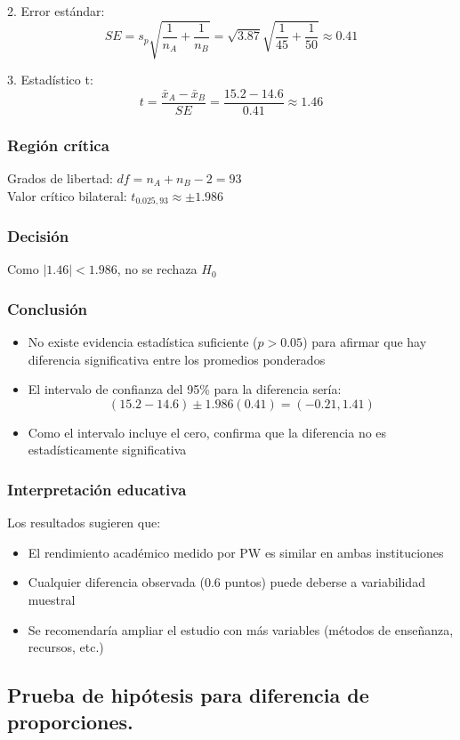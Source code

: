 2. Error estándar:
\[
SE = s_p\sqrt{\frac{1}{n_A} + \frac{1}{n_B}} = \sqrt{3.87}\sqrt{\frac{1}{45} + \frac{1}{50}} \approx 0.41
\]

3. Estadístico t:
\[
t = \frac{\bar{x}_A - \bar{x}_B}{SE} = \frac{15.2 - 14.6}{0.41} \approx 1.46
\]

\subsubsection*{Región crítica}
Grados de libertad: $df = n_A + n_B - 2 = 93$\\
Valor crítico bilateral: $t_{0.025,93} \approx \pm 1.986$

\subsubsection*{Decisión}
Como $|1.46| < 1.986$, no se rechaza $H_0$

\subsubsection*{Conclusión}
\begin{itemize}
\item No existe evidencia estadística suficiente ($p > 0.05$) para afirmar que hay diferencia significativa entre los promedios ponderados
\item El intervalo de confianza del 95\% para la diferencia sería:
\[
(15.2-14.6) \pm 1.986(0.41) = (-0.21, 1.41)
\]
\item Como el intervalo incluye el cero, confirma que la diferencia no es estadísticamente significativa
\end{itemize}

\subsubsection*{Interpretación educativa}
Los resultados sugieren que:
\begin{itemize}
\item El rendimiento académico medido por PW es similar en ambas instituciones
\item Cualquier diferencia observada (0.6 puntos) puede deberse a variabilidad muestral
\item Se recomendaría ampliar el estudio con más variables (métodos de enseñanza, recursos, etc.)
\end{itemize}

\newpage
\subsection{Prueba de hipótesis para diferencia de proporciones.}


